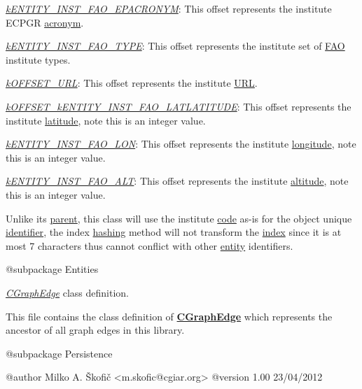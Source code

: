 \begin{DoxyItemize}
\item {\itshape \hyperlink{}{k\-E\-N\-T\-I\-T\-Y\-\_\-\-I\-N\-S\-T\-\_\-\-F\-A\-O\-\_\-\-E\-P\-A\-C\-R\-O\-N\-Y\-M}}\-: This offset represents the institute E\-C\-P\-G\-R \hyperlink{}{acronym}. 
\item {\itshape \hyperlink{}{k\-E\-N\-T\-I\-T\-Y\-\_\-\-I\-N\-S\-T\-\_\-\-F\-A\-O\-\_\-\-T\-Y\-P\-E}}\-: This offset represents the institute set of \hyperlink{}{F\-A\-O} institute types. 
\item {\itshape \hyperlink{}{k\-O\-F\-F\-S\-E\-T\-\_\-\-U\-R\-L}}\-: This offset represents the institute \hyperlink{}{U\-R\-L}. 
\item {\itshape \hyperlink{}{k\-O\-F\-F\-S\-E\-T\-\_\-k\-E\-N\-T\-I\-T\-Y\-\_\-\-I\-N\-S\-T\-\_\-\-F\-A\-O\-\_\-\-L\-A\-T\-L\-A\-T\-I\-T\-U\-D\-E}}\-: This offset represents the institute \hyperlink{}{latitude}, note this is an integer value. 
\item {\itshape \hyperlink{}{k\-E\-N\-T\-I\-T\-Y\-\_\-\-I\-N\-S\-T\-\_\-\-F\-A\-O\-\_\-\-L\-O\-N}}\-: This offset represents the institute \hyperlink{}{longitude}, note this is an integer value. 
\item {\itshape \hyperlink{}{k\-E\-N\-T\-I\-T\-Y\-\_\-\-I\-N\-S\-T\-\_\-\-F\-A\-O\-\_\-\-A\-L\-T}}\-: This offset represents the institute \hyperlink{}{altitude}, note this is an integer value. 
\end{DoxyItemize}

Unlike its \hyperlink{class_c_institute}{parent}, this class will use the institute \hyperlink{}{code} as-\/is for the object unique \hyperlink{}{identifier}, the index \hyperlink{}{hashing} method will not transform the \hyperlink{}{index} since it is at most 7 characters thus cannot conflict with other \hyperlink{class_c_entity}{entity} identifiers.

\begin{DoxyVerb} @subpackage        Entities\end{DoxyVerb}


{\itshape \hyperlink{class_c_graph_edge}{C\-Graph\-Edge}} class definition.

This file contains the class definition of {\bfseries \hyperlink{class_c_graph_edge}{C\-Graph\-Edge}} which represents the ancestor of all graph edges in this library.

\begin{DoxyVerb} @subpackage        Persistence

 @author            Milko A. Škofič <m.skofic@cgiar.org>
 @version   1.00 23/04/2012\end{DoxyVerb}


